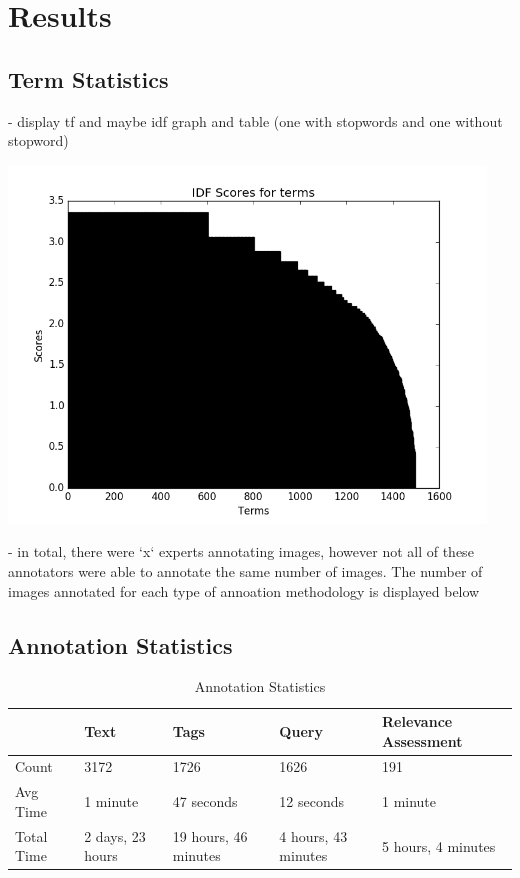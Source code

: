 \chapter{Results}

\section{Term Statistics}

- display tf and maybe idf graph and table (one with stopwords and one without stopword)

\includegraphics[width=0.95\textwidth]{images/graphs/idf}

- in total, there were `x` experts annotating images, however not all of these annotators were able to annotate the same number of images. The number of images annotated for each type of annoation methodology is displayed below


\section{Annotation Statistics}

\begin{table}[htb]
    \centering
    \begin{adjustbox}{center}
    \begin{tabular}{ | l | l | l | l | p{5cm} |}
    \hline
    & Text & Tags & Query & Relevance Assessment \\ \hline
    Count & 3172 & 1726 & 1626 & 191 \\ \hline
    Avg Time & 1 minute & 47 seconds & 12 seconds & 1 minute \\ \hline
    Total Time & 2 days, 23 hours & 19 hours, 46 minutes & 4 hours, 43 minutes & 5 hours, 4 minutes \\ \hline
    \end{tabular}
    \end{adjustbox}
    \caption{Annotation Statistics}
\end{table}

